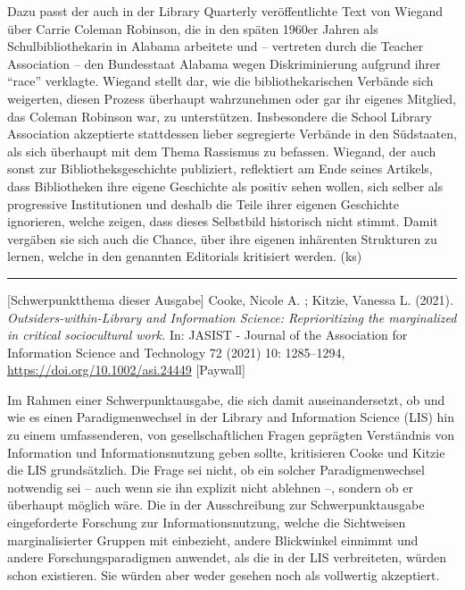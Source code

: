 \documentclass[a4paper,
fontsize=11pt,
oneside,
numbers=noperiodatend,
parskip=half-,
bibliography=totoc,
final
]{scrartcl}
\begin{document}
Dazu passt der auch in der Library Quarterly veröffentlichte Text von
Wiegand über Carrie Coleman Robinson, die in den späten 1960er Jahren
als Schulbibliothekarin in Alabama arbeitete und -- vertreten durch die
Teacher Association -- den Bundesstaat Alabama wegen Diskriminierung
aufgrund ihrer \enquote{race} verklagte. Wiegand stellt dar, wie die
bibliothekarischen Verbände sich weigerten, diesen Prozess überhaupt
wahrzunehmen oder gar ihr eigenes Mitglied, das Coleman Robinson war, zu
unterstützen. Insbesondere die School Library Association akzeptierte
stattdessen lieber segregierte Verbände in den Südstaaten, als sich
überhaupt mit dem Thema Rassismus zu befassen. Wiegand, der auch sonst
zur Bibliotheksgeschichte publiziert, reflektiert am Ende seines
Artikels, dass Bibliotheken ihre eigene Geschichte als positiv sehen
wollen, sich selber als progressive Institutionen und deshalb die Teile
ihrer eigenen Geschichte ignorieren, welche zeigen, dass dieses
Selbstbild historisch nicht stimmt. Damit vergäben sie sich auch die
Chance, über ihre eigenen inhärenten Strukturen zu lernen, welche in den
genannten Editorials kritisiert werden. (ks)

\begin{center}\rule{0.5\linewidth}{0.5pt}\end{center}

{[}Schwerpunktthema dieser Ausgabe{]} Cooke, Nicole A. ; Kitzie, Vanessa
L. (2021). \emph{Outsiders-within-Library and Information Science:
Reprioritizing the marginalized in critical sociocultural work.} In:
JASIST - Journal of the Association for Information Science and
Technology 72 (2021) 10: 1285--1294,
\url{https://doi.org/10.1002/asi.24449} {[}Paywall{]}

Im Rahmen einer Schwerpunktausgabe, die sich damit auseinandersetzt, ob
und wie es einen Paradigmenwechsel in der Library and Information
Science (LIS) hin zu einem umfassenderen, von gesellschaftlichen Fragen
geprägten Verständnis von Information und Informationsnutzung geben
sollte, kritisieren Cooke und Kitzie die LIS grundsätzlich. Die Frage
sei nicht, ob ein solcher Paradigmenwechsel notwendig sei -- auch wenn
sie ihn explizit nicht ablehnen --, sondern ob er überhaupt möglich
wäre. Die in der Ausschreibung zur Schwerpunktausgabe eingeforderte
Forschung zur Informationsnutzung, welche die Sichtweisen
marginalisierter Gruppen mit einbezieht, andere Blickwinkel einnimmt und
andere Forschungsparadigmen anwendet, als die in der LIS verbreiteten,
würden schon existieren. Sie würden aber weder gesehen noch als
vollwertig akzeptiert.
\end{document}
